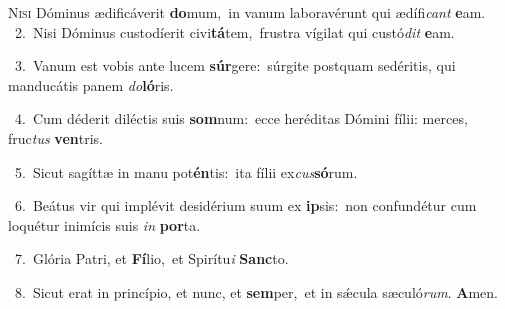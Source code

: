 \lettrine{\initial\textcolor{\initialcolor}{N}}{isi} Dóminus ædificáverit \textbf{do}\-mum,~\star in vanum laboravérunt qui ædífi\textit{cant} \textbf{e}\-am.\\
{\numbfont\textcolor{\numbcolor}{~2.}}~Nisi Dóminus custodíerit civi\-\textbf{tá}\-tem,~\star frustra vígilat qui custó\textit{dit} \textbf{e}\-am.\par
{\numbfont\textcolor{\numbcolor}{~3.}}~Vanum est vobis ante lucem \textbf{súr}\-gere:~\star súrgite postquam sedéritis, qui manducátis panem \textit{do}\-\textbf{ló}ris.\par
{\numbfont\textcolor{\numbcolor}{~4.}}~Cum déderit diléctis suis \textbf{som}\-num:~\star ecce heréditas Dómini fílii: merces, fruc\textit{tus} \textbf{ven}\-tris.\par
{\numbfont\textcolor{\numbcolor}{~5.}}~Sicut sagíttæ in manu pot\-\textbf{én}\-tis:~\star ita fílii ex\-\textit{cus}\-\textbf{só}rum.\par
{\numbfont\textcolor{\numbcolor}{~6.}}~Beátus vir qui implévit desidérium suum ex \textbf{ip}\-sis:~\star non confundétur cum loquétur inimícis suis \textit{in} \textbf{por}\-ta.\par
{\numbfont\textcolor{\numbcolor}{~7.}}~Glória Patri, et \textbf{Fí}\-lio,~\star et Spirítu\textit{i} \textbf{Sanc}\-to.\par
{\numbfont\textcolor{\numbcolor}{~8.}}~Sicut erat in princípio, et nunc, et \textbf{sem}\-per,~\star et in sǽcula sæculó\-\textit{rum}\-. \textbf{A}\-men.\par
